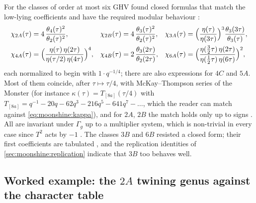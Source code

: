 For the classes of order at most six GHV found closed formulas that match the low-lying
coefficients and have the required modular behaviour :
\begin{equation}\label{eq:moonshine:closed}
\begin{aligned}
  \chi_{2A}(\tau)&=4\,\frac{\theta_4(\tau)^2}{\theta_2(\tau)^2},&
  \chi_{2B}(\tau)&=4\,\frac{\theta_3(\tau)^2}{\theta_2(\tau)^2},&
  \chi_{3A}(\tau)&=\Bigl(\frac{\eta(\tau)}{\eta(3\tau)}\Bigr)^3
     \frac{\theta_3(3\tau)}{\theta_3(\tau)},\\
  \chi_{4A}(\tau)&=\Bigl(\frac{\eta(\tau)\,\eta(2\tau)}{\eta(\tau/2)\,\eta(4\tau)}\Bigr)^4,&
  \chi_{4B}(\tau)&=2\,\frac{\theta_3(2\tau)}{\theta_2(2\tau)},&
  \chi_{6A}(\tau)&=\Bigl(\frac{\eta(\tfrac32\tau)\,\eta(2\tau)}{\eta(\tfrac12\tau)\,\eta(6\tau)}\Bigr)^2,
\end{aligned}
\end{equation}
each normalized to begin with $1\cdot q^{-1/4}$; there are also expressions for $4C$ and
$5A$. Most of them coincide, after $\tau\mapsto\tau/4$, with McKay--Thompson series of the
Monster (for instance $\kappa(\tau)=T_{[8a]}(\tau/4)$ with
$T_{[8a]}=q^{-1}-20q-62q^3-216q^5-641q^7-\dots$, which the reader can match against
\eqref{eq:moonshine:kappa}), and for $2A$, $2B$ the match holds only up to signs
. All are invariant under $\Gamma_g$ up to a multiplier
system, which is non-trivial in every case since $T^2$ acts by $-1$
. The classes $3B$ and $6B$ resisted a closed form; their
first coefficients are tabulated , and the replication
identities of \cref{sec:moonshine:replication} indicate that $3B$ too behaves well.

\subsection{Worked example: the \texorpdfstring{$2A$}{2A} twining genus against the
character table}\label{sec:moonshine:worked2}

